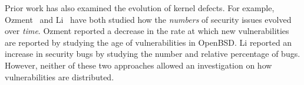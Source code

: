 

Prior work has also examined the evolution of kernel defects. For example, 
Ozment~\cite{ozment2006milk} and Li~\cite{li2006have} have 
both studied how the \textit{numbers} of security issues evolved over 
\textit{time}. Ozment reported a decrease in the rate at which new vulnerabilities 
are reported by studying the age of vulnerabilities in OpenBSD. Li 
reported an increase in security bugs by studying the number and relative 
percentage of bugs. However, neither of these two approaches allowed 
an investigation on how vulnerabilities are distributed. 

